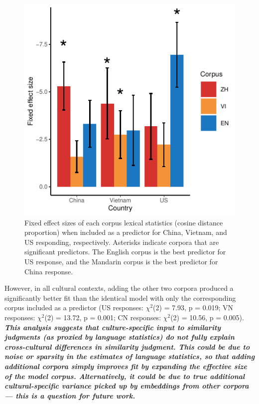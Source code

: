 \documentclass[10pt, letterpaper]{article}
\newenvironment{CodeChunk}{}{}
\begin{document}
\begin{CodeChunk}
\begin{figure}[tb]

{\centering \includegraphics{figs/coeffs_cos-1} 

}

\caption[Fixed effect sizes of each corpus lexical statistics (cosine distance proportion) when included as a predictor for China, Vietnam, and US responding, respectively]{Fixed effect sizes of each corpus lexical statistics (cosine distance proportion) when included as a predictor for China, Vietnam, and US responding, respectively. Asterisks indicate corpora that are significant predictors. The English corpus is the best predictor for US response, and the Mandarin corpus is the best predictor for China response.}\label{fig:coeffs_cos}
\end{figure}
\end{CodeChunk}

However, in all cultural contexts, adding the other two corpora produced
a significantly better fit than the identical model with only the
corresponding corpus included as a predictor (US responses:
\(\chi^2\)(2) = 7.93, p = 0.019; VN responses: \(\chi^2\)(2) = 13.72, p
= 0.001; CN responses: \(\chi^2\)(2) = 10.56, p = 0.005).
\textbf{\emph{This analysis suggests that culture-specific input to
similarity judgments (as proxied by language statistics) do not fully
explain cross-cultural differences in similarity judgment. This could be
due to noise or sparsity in the estimates of language statistics, so
that adding additional corpora simply improves fit by expanding the
effective size of the model corpus. Alternatively, it could be due to
true additional cultural-specific variance picked up by embeddings from
other corpora --- this is a question for future work.}}
\end{document}
